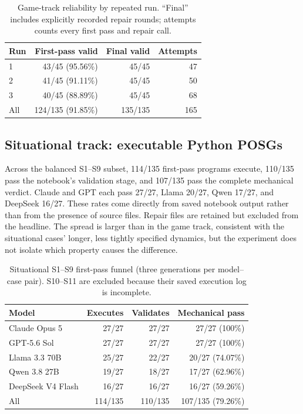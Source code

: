 \documentclass{article}
\begin{document}
\begin{table}[t]
\centering
\small
\caption{Game-track reliability by repeated run. ``Final'' includes explicitly recorded repair rounds; attempts counts every first pass and repair call.}
\label{tab:game_runs}
\begin{tabular}{lrrr}
\toprule
Run & First-pass valid & Final valid & Attempts \\
\midrule
1 & 43/45 (95.56\%) & 45/45 & 47 \\
2 & 41/45 (91.11\%) & 45/45 & 50 \\
3 & 40/45 (88.89\%) & 45/45 & 68 \\
\midrule
All & 124/135 (91.85\%) & 135/135 & 165 \\
\bottomrule
\end{tabular}
\end{table}

\subsection{Situational track: executable Python POSGs}
Across the balanced S1--S9 subset, 114/135 first-pass programs execute, 110/135 pass the notebook's validation stage, and 107/135 pass the complete mechanical verdict. Claude and GPT each pass 27/27, Llama 20/27, Qwen 17/27, and DeepSeek 16/27. These rates come directly from saved notebook output rather than from the presence of source files. Repair files are retained but excluded from the headline. The spread is larger than in the game track, consistent with the situational cases' longer, less tightly specified dynamics, but the experiment does not isolate which property causes the difference.

\begin{table}[t]
\centering
\small
\caption{Situational S1--S9 first-pass funnel (three generations per model--case pair). S10--S11 are excluded because their saved execution log is incomplete.}
\label{tab:situational}
\begin{tabular}{lrrr}
\toprule
Model & Executes & Validates & Mechanical pass \\
\midrule
Claude Opus 5 & 27/27 & 27/27 & 27/27 (100\%) \\
GPT-5.6 Sol & 27/27 & 27/27 & 27/27 (100\%) \\
Llama 3.3 70B & 25/27 & 22/27 & 20/27 (74.07\%) \\
Qwen 3.8 27B & 19/27 & 18/27 & 17/27 (62.96\%) \\
DeepSeek V4 Flash & 16/27 & 16/27 & 16/27 (59.26\%) \\
\midrule
All & 114/135 & 110/135 & 107/135 (79.26\%) \\
\bottomrule
\end{tabular}
\end{table}
\end{document}
